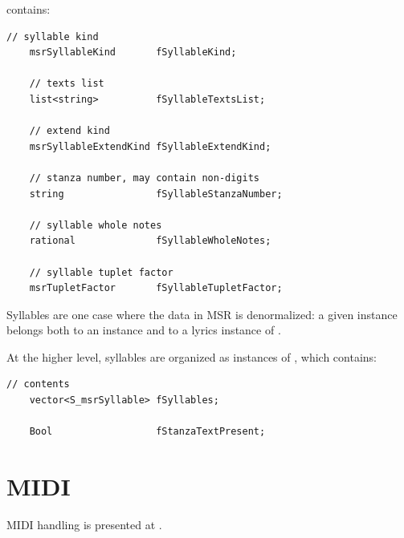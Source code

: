  contains:
\begin{lstlisting}[language=CPlusPlus]
    // syllable kind
    msrSyllableKind       fSyllableKind;

    // texts list
    list<string>          fSyllableTextsList;

    // extend kind
    msrSyllableExtendKind fSyllableExtendKind;

    // stanza number, may contain non-digits
    string                fSyllableStanzaNumber;

    // syllable whole notes
    rational              fSyllableWholeNotes;

    // syllable tuplet factor
    msrTupletFactor       fSyllableTupletFactor;
\end{lstlisting}

Syllables are one case where the data in MSR is denormalized: a given  instance belongs both to an  instance and to a lyrics instance of .

At the higher level, syllables are organized as instances of , which contains:
\begin{lstlisting}[language=CPlusPlus]
    // contents
    vector<S_msrSyllable> fSyllables;

    Bool                  fStanzaTextPresent;
\end{lstlisting}


\section{MIDI}\label{MIDI}

MIDI handling is presented at .
